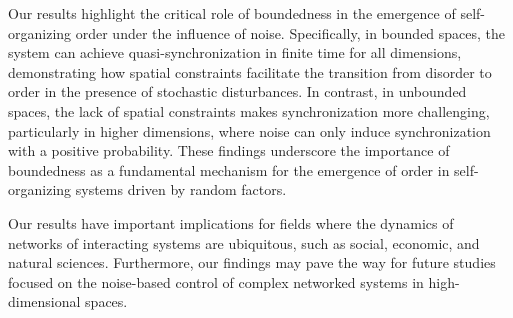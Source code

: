 \documentclass[11pt]{article}
\theoremstyle{definition}
\theoremstyle{remark}
\numberwithin{equation}{section}
\begin{document}
Our results highlight the critical role of boundedness in the emergence of self-organizing order under the influence of noise. Specifically, in bounded spaces, the system can achieve quasi-synchronization in finite time for all dimensions, demonstrating how spatial constraints facilitate the transition from disorder to order in the presence of stochastic disturbances. In contrast, in unbounded spaces, the lack of spatial constraints makes synchronization more challenging, particularly in higher dimensions, where noise can only induce synchronization with a positive probability. These findings underscore the importance of boundedness as a fundamental mechanism for the emergence of order in self-organizing systems driven by random factors.

Our results have important implications for fields where the dynamics of networks of interacting systems are ubiquitous, such as social, economic, and natural sciences. Furthermore, our findings may pave the way for future studies focused on the noise-based control of complex networked systems in high-dimensional spaces.
\end{document}
